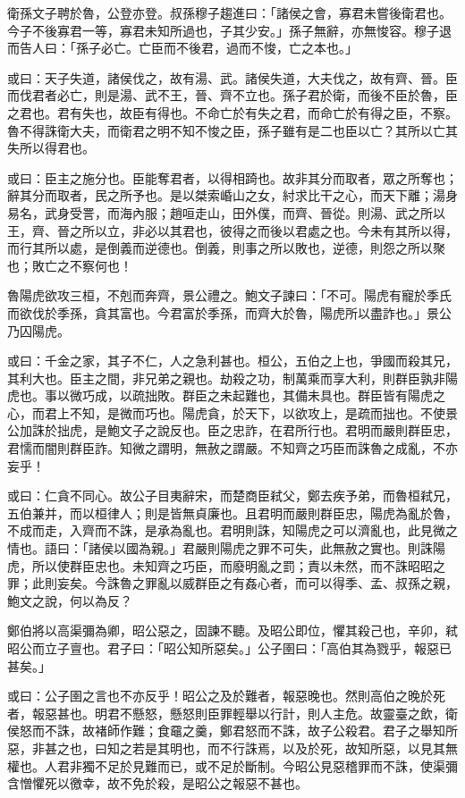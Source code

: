 
\begin{pinyinscope}
衛孫文子聘於魯，公登亦登。叔孫穆子趨進曰：「諸侯之會，寡君未嘗後衛君也。今子不後寡君一等，寡君未知所過也，子其少安。」孫子無辭，亦無悛容。穆子退而告人曰：「孫子必亡。亡臣而不後君，過而不悛，亡之本也。」

或曰：天子失道，諸侯伐之，故有湯、武。諸侯失道，大夫伐之，故有齊、晉。臣而伐君者必亡，則是湯、武不王，晉、齊不立也。孫子君於衛，而後不臣於魯，臣之君也。君有失也，故臣有得也。不命亡於有失之君，而命亡於有得之臣，不察。魯不得誅衛大夫，而衛君之明不知不悛之臣，孫子雖有是二也臣以亡？其所以亡其失所以得君也。

或曰：臣主之施分也。臣能奪君者，以得相踦也。故非其分而取者，眾之所奪也；辭其分而取者，民之所予也。是以桀索崏山之女，紂求比干之心，而天下離；湯身易名，武身受詈，而海內服；趙咺走山，田外僕，而齊、晉從。則湯、武之所以王，齊、晉之所以立，非必以其君也，彼得之而後以君處之也。今未有其所以得，而行其所以處，是倒義而逆德也。倒義，則事之所以敗也，逆德，則怨之所以聚也；敗亡之不察何也！

魯陽虎欲攻三桓，不剋而奔齊，景公禮之。鮑文子諫曰：「不可。陽虎有寵於季氏而欲伐於季孫，貪其富也。今君富於季孫，而齊大於魯，陽虎所以盡詐也。」景公乃囚陽虎。

或曰：千金之家，其子不仁，人之急利甚也。桓公，五伯之上也，爭國而殺其兄，其利大也。臣主之間，非兄弟之親也。劫殺之功，制萬乘而享大利，則群臣孰非陽虎也。事以微巧成，以疏拙敗。群臣之未起難也，其備未具也。群臣皆有陽虎之心，而君上不知，是微而巧也。陽虎貪，於天下，以欲攻上，是疏而拙也。不使景公加誅於拙虎，是鮑文子之說反也。臣之忠詐，在君所行也。君明而嚴則群臣忠，君懦而闇則群臣詐。知微之謂明，無赦之謂嚴。不知齊之巧臣而誅魯之成亂，不亦妄乎！

或曰：仁貪不同心。故公子目夷辭宋，而楚商臣弒父，鄭去疾予弟，而魯桓弒兄，五伯兼并，而以桓律人；則是皆無貞廉也。且君明而嚴則群臣忠，陽虎為亂於魯，不成而走，入齊而不誅，是承為亂也。君明則誅，知陽虎之可以濟亂也，此見微之情也。語曰：「諸侯以國為親。」君嚴則陽虎之罪不可失，此無赦之實也。則誅陽虎，所以使群臣忠也。未知齊之巧臣，而廢明亂之罰；責以未然，而不誅昭昭之罪；此則妄矣。今誅魯之罪亂以威群臣之有姦心者，而可以得季、孟、叔孫之親，鮑文之說，何以為反？

鄭伯將以高渠彌為卿，昭公惡之，固諫不聽。及昭公即位，懼其殺己也，辛卯，弒昭公而立子亶也。君子曰：「昭公知所惡矣。」公子圉曰：「高伯其為戮乎，報惡已甚矣。」

或曰：公子圉之言也不亦反乎！昭公之及於難者，報惡晚也。然則高伯之晚於死者，報惡甚也。明君不懸怒，懸怒則臣罪輕舉以行計，則人主危。故靈臺之飲，衛侯怒而不誅，故褚師作難；食黿之羹，鄭君怒而不誅，故子公殺君。君子之舉知所惡，非甚之也，曰知之若是其明也，而不行誅焉，以及於死，故知所惡，以見其無權也。人君非獨不足於見難而已，或不足於斷制。今昭公見惡稽罪而不誅，使渠彌含憎懼死以徼幸，故不免於殺，是昭公之報惡不甚也。


\end{pinyinscope}
